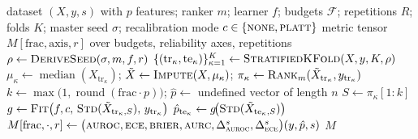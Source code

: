 \documentclass[fleqn,10pt]{wlscirep}
\begin{document}
\begin{algorithm}[t]
\caption{\textsc{CertifyFeatureReduction}: leakage-safe per-configuration evaluation.}
\label{alg:certify}
\begin{algorithmic}[1]
\Require dataset $(X,y,s)$ with $p$ features; ranker $m$; learner $f$; budgets $\mathcal{F}$;
  repetitions $R$; folds $K$; master seed $\sigma$; recalibration mode $c\in\{\textsc{none},\textsc{platt}\}$
\Ensure metric tensor $M[\mathrm{frac},\text{axis},r]$ over budgets, reliability axes, repetitions
  \State $\rho \gets \textsc{DeriveSeed}(\sigma, m, f, r)$ 
  \State $\{(\mathrm{tr}_\kappa,\mathrm{te}_\kappa)\}_{\kappa=1}^{K} \gets \textsc{StratifiedKFold}(X,y,K,\rho)$
   
    \State $\mu_\kappa \gets \operatorname{median}(X_{\mathrm{tr}_\kappa})$;\quad
      $\tilde X \gets \textsc{Impute}(X,\mu_\kappa)$;\quad
      $\pi_\kappa \gets \textsc{Rank}_m(\tilde X_{\mathrm{tr}_\kappa}, y_{\mathrm{tr}_\kappa})$
  \EndFor
    \State $k \gets \max\!\big(1,\operatorname{round}(\mathrm{frac}\cdot p)\big)$;\quad
      $\hat p \gets$ undefined vector of length $n$
      \State $S \gets \pi_\kappa[1{:}k]$ 
      \State $g \gets \textsc{Fit}\big(f, c,\, \textsc{Std}(\tilde X_{\mathrm{tr}_\kappa,S}),\, y_{\mathrm{tr}_\kappa}\big)$
      \State $\hat p_{\mathrm{te}_\kappa} \gets g\!\big(\textsc{Std}(\tilde X_{\mathrm{te}_\kappa,S})\big)$
    \EndFor
    \State $M[\mathrm{frac},\cdot,r] \gets
      \big(\textsc{auroc},\textsc{ece},\textsc{brier},\textsc{aurc},\Delta^{s}_{\textsc{auroc}},
      \Delta^{s}_{\textsc{ece}}\big)(y,\hat p,s)$
  \EndFor
\EndFor
\State \Return $M$
\end{algorithmic}
\end{algorithm}
\end{document}
